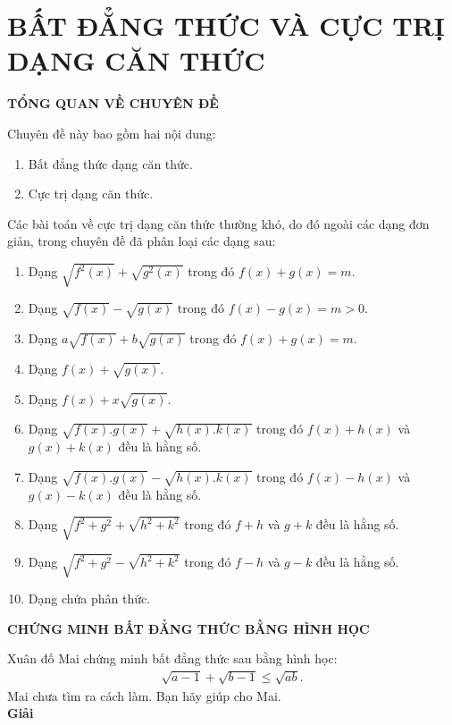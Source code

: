 \section{BẤT ĐẲNG THỨC VÀ CỰC TRỊ DẠNG CĂN THỨC}

\begin{center}
 \large \textbf{TỔNG QUAN VỀ CHUYÊN ĐỀ}
\end{center}
Chuyên đề này bao gồm hai nội dung:
\begin{enumerate}[--]
	\item Bất đẳng thức dạng căn thức.
	\item Cực trị dạng căn thức.
\end{enumerate}
Các bài toán về cực trị dạng căn thức thường khó, do đó ngoài các dạng đơn giản, trong chuyên đề đã phân loại các dạng sau:
\begin{enumerate}[--]
	\item Dạng $\sqrt{f^2(x)}+\sqrt{g^2(x)}$ trong đó $f(x)+g(x)=m. $
	\item Dạng $\sqrt{f(x)}-\sqrt{g(x)}$ trong đó $f(x)-g(x) =m >0.$
	\item Dạng $a\sqrt{f(x)}+b\sqrt{g(x)}$ trong đó $f(x)+g(x) =m.$
	\item Dạng $f(x)+\sqrt{g(x)}.$
	\item Dạng $f(x)+x\sqrt{g(x)}.$
	\item Dạng $\sqrt{f(x).g(x)}+\sqrt{h(x).k(x)}$ trong đó $f(x)+h(x)$ và $g(x)+k(x)$ đều là hằng số.
	\item Dạng $\sqrt{f(x).g(x)}-\sqrt{h(x).k(x)}$ trong đó $f(x)-h(x)$ và $g(x)-k(x)$ đều là hằng số.
	\item Dạng $\sqrt{f^2+g^2}+\sqrt{h^2+k^2}$ trong đó $f+h$ và $g+k$ đều là hằng số.	
	\item Dạng $\sqrt{f^2+g^2}-\sqrt{h^2+k^2}$ trong đó $f-h$ và $g-k$ đều là hằng số.
	\item Dạng chứa phân thức.
\end{enumerate}
\begin{center}
	\textbf{CHỨNG MINH BẤT ĐẲNG THỨC BẰNG HÌNH HỌC}
\end{center}
Xuân đố Mai chứng minh bất đẳng thức sau bằng hình học:
\begin{align*}
	\sqrt{a-1}+\sqrt{b-1} \leq \sqrt{ab}.
\end{align*}
Mai chưa tìm ra cách làm. Bạn hãy giúp cho Mai.\\
\textbf{Giải}
